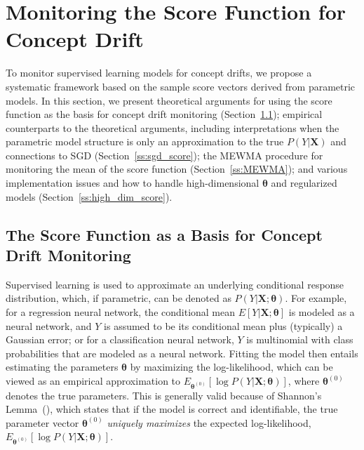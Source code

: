 \documentclass[twoside,11pt]{article}
\begin{document}
\section{Monitoring the Score Function for Concept Drift}
\label{s:theory_analysis_score}
To monitor supervised learning models for concept drifts, we propose a systematic framework based on the sample score vectors derived from parametric models. In this section, we present theoretical arguments for using the score function as the basis for concept drift monitoring (Section~\ref{ss:score_func}); empirical counterparts to the theoretical arguments, including interpretations when the parametric model structure is only an approximation to the true $P(Y|\bm{X})$ and connections to SGD (Section~\ref{ss:sgd_score}); the MEWMA procedure for monitoring the mean of the score function (Section~\ref{ss:MEWMA}); and various implementation issues and how to handle high-dimensional $\bm{\theta}$ and regularized models (Section~\ref{ss:high_dim_score}).

\subsection{The Score Function as a Basis for Concept Drift Monitoring}
\label{ss:score_func}
Supervised learning is used to approximate an underlying conditional response distribution, which, if parametric, can be denoted as $P(Y|\bm{X};\bm{\theta})$. For example, for a regression neural network, the conditional mean $E[Y|\bm{X};\bm{\theta}]$ is modeled as a neural network, and $Y$ is assumed to be its conditional mean plus (typically) a Gaussian error; or for a classification neural network, $Y$ is multinomial with class probabilities that are modeled as a neural network. Fitting the model then entails estimating the parameters $\bm{\theta}$ by maximizing the log-likelihood, which can be viewed as an empirical approximation to $E_{\bm{\theta}^{(0)}}[\log{P(Y|\bm{X};\bm{\theta})}]$, where $\bm{\theta}^{(0)}$ denotes the true parameters. This is generally valid because of Shannon's Lemma~(\cite{shannon1948mathematical}), which states that if the model is correct and identifiable, the true parameter vector $\bm{\theta}^{(0)}$ \textit{uniquely maximizes} the expected log-likelihood, $E_{\bm{\theta}^{(0)}}[\log{P(Y|\bm{X};\bm{\theta})}]$. 
\end{document}

